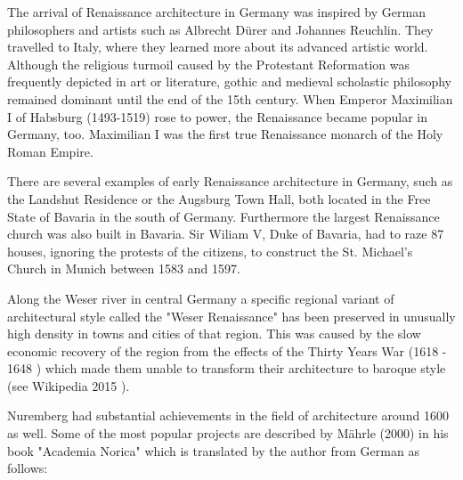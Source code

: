 The arrival of Renaissance architecture in Germany was inspired by German philosophers and artists such as Albrecht Dürer and Johannes Reuchlin. They travelled to Italy, where they learned more about its advanced artistic world. Although the religious turmoil caused by the Protestant Reformation was frequently depicted in art or literature, gothic and medieval scholastic philosophy remained dominant until the end of the 15th century. When Emperor Maximilian I of Habsburg (1493-1519) rose to power, the Renaissance became popular in Germany, too. Maximilian I was the first true Renaissance monarch of the Holy Roman Empire.

There are several examples of early Renaissance architecture in Germany, such as the Landshut Residence or the Augsburg Town Hall, both located in the Free State of Bavaria in the south of Germany. Furthermore the largest Renaissance church was also built in Bavaria. Sir Wiliam V, Duke of Bavaria, had to raze 87 houses, ignoring the protests of the citizens, to construct the St. Michael's Church in Munich between 1583 and 1597.

Along the Weser river in central Germany a specific regional variant of architectural style called the "Weser Renaissance" has been preserved in unusually high density in towns and cities of that region. This was caused by the slow economic recovery of the region from the effects of the Thirty Years War (1618 - 1648 ) which made them unable to transform their architecture to baroque style (see Wikipedia 2015 \parencite{wiki:GermanRenaissance}).

Nuremberg had substantial achievements in the field of architecture around 1600 as well. Some of the most popular projects are described by Mährle (2000) in his book "Academia Norica" \parencite{bookAcademiaNorica} which is translated by the author from German as follows: 

